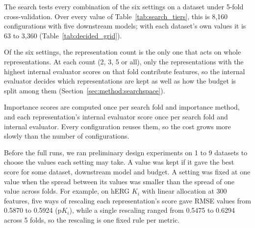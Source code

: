 The search tests every combination of the six settings on a dataset under 5-fold cross-validation. Over every value of Table~\ref{tab:search_tiers}, this is 8,160 configurations with five downstream models; with each dataset's own values it is 63 to 3,360 (Table~\ref{tab:decided_grid}).

Of the six settings, the representation count is the only one that acts on whole representations. At each count (2, 3, 5 or all), only the representations with the highest internal evaluator scores on that fold contribute features, so the internal evaluator decides which representations are kept as well as how the budget is split among them (Section~\ref{sec:method:searchspace}).


Importance scores are computed once per search fold and importance method, and each representation's internal evaluator score once per search fold and internal evaluator. Every configuration reuses them, so the cost grows more slowly than the number of configurations.


Before the full runs, we ran preliminary design experiments on 1 to 9 datasets to choose the values each setting may take. A value was kept if it gave the best score for some dataset, downstream model and budget. A setting was fixed at one value when the spread between its values was smaller than the spread of one value across folds. For example, on hERG $K_i$ with linear allocation at 300 features, five ways of rescaling each representation's score gave RMSE values from 0.5870 to 0.5924 (p$K_i$), while a single rescaling ranged from 0.5475 to 0.6294 across 5 folds, so the rescaling is one fixed rule per metric.

